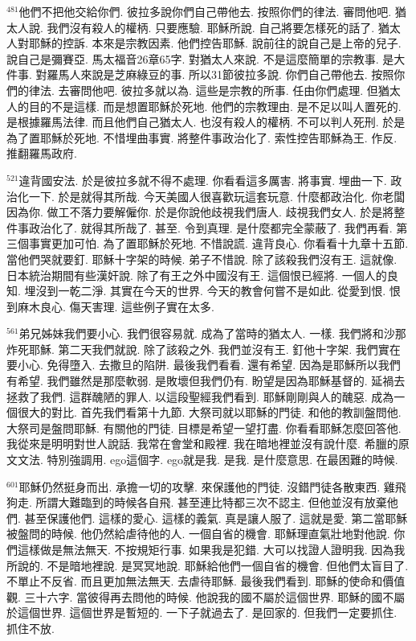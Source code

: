 \documentclass{book}
\begin{document}
$^{481}$他們不把他交給你們.
彼拉多說你們自己帶他去.
按照你們的律法.
審問他吧.
猶太人說.
我們沒有殺人的權柄.
只要應驗.
耶穌所說.
自己將要怎樣死的話了.
猶太人對耶穌的控訴.
本來是宗教因素.
他們控告耶穌.
說前往的說自己是上帝的兒子.
說自己是彌賽亞.
馬太福音26章65字.
對猶太人來說.
不是這麼簡單的宗教事.
是大件事.
對羅馬人來說是芝麻綠豆的事.
所以31節彼拉多說.
你們自己帶他去.
按照你們的律法.
去審問他吧.
彼拉多就以為.
這些是宗教的所事.
任由你們處理.
但猶太人的目的不是這樣.
而是想置耶穌於死地.
他們的宗教理由.
是不足以叫人置死的.
是根據羅馬法律.
而且他們自己猶太人.
也沒有殺人的權柄.
不可以判人死刑.
於是為了置耶穌於死地.
不惜埋曲事實.
將整件事政治化了.
索性控告耶穌為王.
作反.
推翻羅馬政府.

$^{521}$違背國安法.
於是彼拉多就不得不處理.
你看看這多厲害.
將事實.
埋曲一下.
政治化一下.
於是就得其所哉.
今天美國人很喜歡玩這套玩意.
什麼都政治化.
你老闆因為你.
做工不落力要解僱你.
於是你說他歧視我們唐人.
歧視我們女人.
於是將整件事政治化了.
就得其所哉了.
甚至.
令到真理.
是什麼都完全蒙蔽了.
我們再看.
第三個事實更加可怕.
為了置耶穌於死地.
不惜說謊.
違背良心.
你看看十九章十五節.
當他們哭就要釘.
耶穌十字架的時候.
弟子不惜說.
除了該殺我們沒有王.
這就像.
日本統治期間有些漢奸說.
除了有王之外中國沒有王.
這個恨已經將.
一個人的良知.
埋沒到一乾二淨.
其實在今天的世界.
今天的教會何嘗不是如此.
從愛到恨.
恨到麻木良心.
傷天害理.
這些例子實在太多.

$^{561}$弟兄姊妹我們要小心.
我們很容易就.
成為了當時的猶太人.
一樣.
我們將和沙那炸死耶穌.
第二天我們就說.
除了該殺之外.
我們並沒有王.
釘他十字架.
我們實在要小心.
免得墮入.
去撒旦的陷阱.
最後我們看看.
還有希望.
因為是耶穌所以我們有希望.
我們雖然是那麼軟弱.
是敗壞但我們仍有.
盼望是因為耶穌基督的.
延禍去拯救了我們.
這群醜陋的罪人.
以這段聖經我們看到.
耶穌剛剛與人的醜惡.
成為一個很大的對比.
首先我們看第十九節.
大祭司就以耶穌的門徒.
和他的教訓盤問他.
大祭司是盤問耶穌.
有關他的門徒.
目標是希望一望打盡.
你看看耶穌怎麼回答他.
我從來是明明對世人說話.
我常在會堂和殿裡.
我在暗地裡並沒有說什麼.
希臘的原文文法.
特別強調用.
ego這個字.
ego就是我.
是我.
是什麼意思.
在最困難的時候.

$^{601}$耶穌仍然挺身而出.
承擔一切的攻擊.
來保護他的門徒.
沒錯門徒各散東西.
雞飛狗走.
所謂大難臨到的時候各自飛.
甚至連比特都三次不認主.
但他並沒有放棄他們.
甚至保護他們.
這樣的愛心.
這樣的義氣.
真是讓人服了.
這就是愛.
第二當耶穌被盤問的時候.
他仍然給虐待他的人.
一個自省的機會.
耶穌理直氣壯地對他說.
你們這樣做是無法無天.
不按規矩行事.
如果我是犯錯.
大可以找證人證明我.
因為我所說的.
不是暗地裡說.
是冥冥地說.
耶穌給他們一個自省的機會.
但他們太盲目了.
不單止不反省.
而且更加無法無天.
去虐待耶穌.
最後我們看到.
耶穌的使命和價值觀.
三十六字.
當彼得再去問他的時候.
他說我的國不屬於這個世界.
耶穌的國不屬於這個世界.
這個世界是暫短的.
一下子就過去了.
是回家的.
但我們一定要抓住.
抓住不放.
\end{document}
